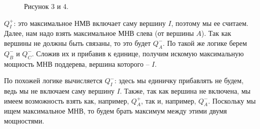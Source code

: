 \documentclass[12pt]{article}
\begin{document}
\begin{figure}[h]
  \begin{minipage}[h]{0.49\linewidth}
  \end{minipage}
  \hfill
  \begin{minipage}[h]{0.49\linewidth}
  \end{minipage}
  \caption{Рисунок 3 и 4.}
  \end{figure}

  $Q_{I}^+$: это максимальное НМВ включает саму вершину $I$, поэтому мы ее считаем. Далее, нам надо взять максимальное МНВ слева (от вершины $A$). Так как вершины не должны быть связаны,
  то это будет $Q_{A}^-$. По такой же логике берем $Q_{B}^-$ и $Q_{C}^-$. Сложив их и прибавив к единице, получим искомую максимальную мощность МНВ поддерева, вершина которого -- $I$.
  
  По похожей логике вычисляется $Q_{I}^-$: здесь мы единичку прибавлять не будем, ведь мы не включаем саму вершину $I$. Также, так как вершина не включена, мы имеем возможность взять как, например, $Q_{A}^+$, так и, например, $Q_{A}^-$. Поскольку мы ищем максимальное МНВ, то будем брать максимум между этими двумя мощностями. 
\end{document}
